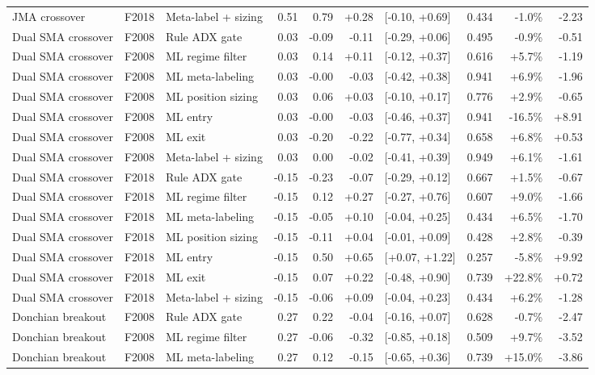 \begin{longtable}{p{2.4cm} l p{2.5cm} r r r l r r r}
JMA crossover & F2018 & Meta-label + sizing & 0.51 & 0.79 & +0.28 & [-0.10, +0.69] & 0.434 & -1.0\% & -2.23 \\
Dual SMA crossover & F2008 & Rule ADX gate & 0.03 & -0.09 & -0.11 & [-0.29, +0.06] & 0.495 & -0.9\% & -0.51 \\
Dual SMA crossover & F2008 & ML regime filter & 0.03 & 0.14 & +0.11 & [-0.12, +0.37] & 0.616 & +5.7\% & -1.19 \\
Dual SMA crossover & F2008 & ML meta-labeling & 0.03 & -0.00 & -0.03 & [-0.42, +0.38] & 0.941 & +6.9\% & -1.96 \\
Dual SMA crossover & F2008 & ML position sizing & 0.03 & 0.06 & +0.03 & [-0.10, +0.17] & 0.776 & +2.9\% & -0.65 \\
Dual SMA crossover & F2008 & ML entry & 0.03 & -0.00 & -0.03 & [-0.46, +0.37] & 0.941 & -16.5\% & +8.91 \\
Dual SMA crossover & F2008 & ML exit & 0.03 & -0.20 & -0.22 & [-0.77, +0.34] & 0.658 & +6.8\% & +0.53 \\
Dual SMA crossover & F2008 & Meta-label + sizing & 0.03 & 0.00 & -0.02 & [-0.41, +0.39] & 0.949 & +6.1\% & -1.61 \\
Dual SMA crossover & F2018 & Rule ADX gate & -0.15 & -0.23 & -0.07 & [-0.29, +0.12] & 0.667 & +1.5\% & -0.67 \\
Dual SMA crossover & F2018 & ML regime filter & -0.15 & 0.12 & +0.27 & [-0.27, +0.76] & 0.607 & +9.0\% & -1.66 \\
Dual SMA crossover & F2018 & ML meta-labeling & -0.15 & -0.05 & +0.10 & [-0.04, +0.25] & 0.434 & +6.5\% & -1.70 \\
Dual SMA crossover & F2018 & ML position sizing & -0.15 & -0.11 & +0.04 & [-0.01, +0.09] & 0.428 & +2.8\% & -0.39 \\
Dual SMA crossover & F2018 & ML entry & -0.15 & 0.50 & +0.65 & [+0.07, +1.22] & 0.257 & -5.8\% & +9.92 \\
Dual SMA crossover & F2018 & ML exit & -0.15 & 0.07 & +0.22 & [-0.48, +0.90] & 0.739 & +22.8\% & +0.72 \\
Dual SMA crossover & F2018 & Meta-label + sizing & -0.15 & -0.06 & +0.09 & [-0.04, +0.23] & 0.434 & +6.2\% & -1.28 \\
Donchian breakout & F2008 & Rule ADX gate & 0.27 & 0.22 & -0.04 & [-0.16, +0.07] & 0.628 & -0.7\% & -2.47 \\
Donchian breakout & F2008 & ML regime filter & 0.27 & -0.06 & -0.32 & [-0.85, +0.18] & 0.509 & +9.7\% & -3.52 \\
Donchian breakout & F2008 & ML meta-labeling & 0.27 & 0.12 & -0.15 & [-0.65, +0.36] & 0.739 & +15.0\% & -3.86 \\

\end{longtable}
